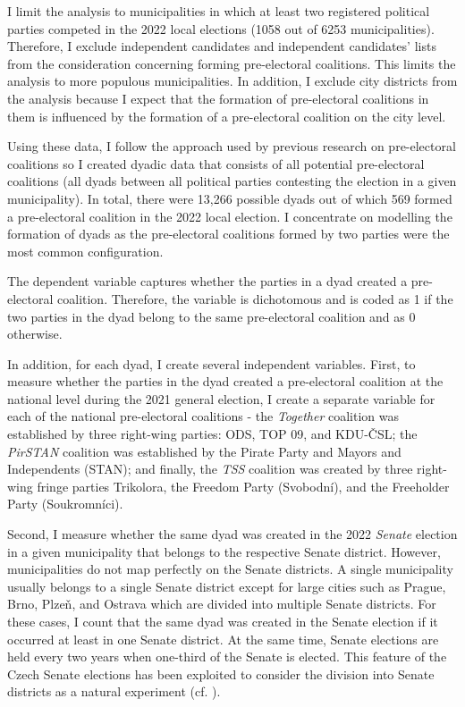 \documentclass[fignum,12pt,titlepage]{article}
\begin{document}
I limit the analysis to municipalities in which at least two registered political parties competed in the 2022 local elections (1058 out of 6253 municipalities). Therefore, I exclude independent candidates and independent candidates' lists from the consideration concerning forming pre-electoral coalitions. This limits the analysis to more populous municipalities. In addition, I exclude city districts from the analysis because I expect that the formation of pre-electoral coalitions in them is influenced by the formation of a pre-electoral coalition on the city level. 

Using these data, I follow the approach used by previous research on pre-electoral coalitions \parencite{golder2005,ibenskas2016} so I created dyadic data that consists of all potential pre-electoral coalitions (all dyads between all political parties contesting the election in a given municipality). In total, there were 13,266 possible dyads out of which 569 formed a pre-electoral coalition in the 2022 local election. I concentrate on modelling the formation of dyads as the pre-electoral coalitions formed by two parties were the most common configuration.

The dependent variable captures whether the parties in a dyad created a pre-electoral coalition. Therefore, the variable is dichotomous and is coded as 1 if the two parties in the dyad belong to the same pre-electoral coalition and as 0 otherwise. 

In addition, for each dyad, I create several independent variables. 
First, to measure whether the parties in the dyad created a pre-electoral coalition at the national level during the 2021 general election, I create a separate variable for each of the national pre-electoral coalitions - the \emph{Together} coalition was established by three right-wing parties: ODS, TOP 09, and KDU-ČSL; the \emph{PirSTAN} coalition was established by the Pirate Party and Mayors and Independents (STAN); and finally, the \emph{TSS} coalition was created by three right-wing fringe parties Trikolora, the Freedom Party (Svobodní), and the Freeholder Party (Soukromníci). 

Second, I measure whether the same dyad was created in the 2022 \emph{Senate} election in a given municipality that belongs to the respective Senate district. However, municipalities do not map perfectly on the Senate districts. A single municipality usually belongs to a single Senate district except for large cities such as Prague, Brno, Plzeň, and Ostrava which are divided into multiple Senate districts. For these cases, I count that the same dyad was created in the Senate election if it occurred at least in one Senate district. At the same time, Senate elections are held every two years when one-third of the Senate is elected. This feature of the Czech Senate elections has been exploited to consider the division into Senate districts as a natural experiment (cf. \cite{roberts2018,lysek2022}). 
\end{document}
